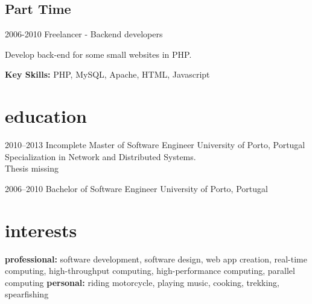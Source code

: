 \documentclass[]{friggeri-cv} %
\begin{document}
\subsection{Part Time}

\begin{entrylist}

\entry
{2006-2010}
{Freelancer - Backend developers}
{}
{
Develop back-end for some small websites in PHP.  

\textbf{Key Skills: }
PHP, MySQL, Apache, HTML, Javascript
}

\end{entrylist}

\pagebreak

\section{education}

\begin{entrylist}


\entry
{2010--2013}
{Incomplete Master {\normalfont of Software Engineer}}
{University of Porto, Portugal}
{Specialization in Network and Distributed Systems.\\Thesis missing}


\entry
{2006--2010}
{Bachelor {\normalfont of Software Engineer}}
{University of Porto, Portugal}
{}


\end{entrylist}


\section{interests}

\textbf{professional:} software development, software design, web app creation, real-time computing, high-throughput computing,  high-performance computing, parallel computing \textbf{personal:} riding motorcycle, playing music, cooking, trekking, spearfishing
\end{document}
